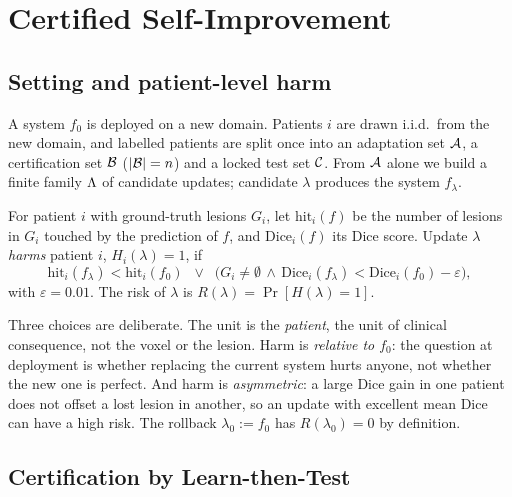 \section{Certified Self-Improvement}
\label{sec:method}

\subsection{Setting and patient-level harm}
\label{sec:harm}

A system $f_0$ is deployed on a new domain.
Patients $i$ are drawn i.i.d.\ from the new domain, and labelled patients are split once into an adaptation set $\mathcal{A}$, a certification set $\mathcal{B}$ ($|\mathcal{B}|=n$) and a locked test set $\mathcal{C}$.
From $\mathcal{A}$ alone we build a finite family $\Lambda$ of candidate updates; candidate $\lambda$ produces the system $f_\lambda$.

\begin{definition}
For patient $i$ with ground-truth lesions $G_i$, let $\mathrm{hit}_i(f)$ be the number of lesions in $G_i$ touched by the prediction of $f$, and $\mathrm{Dice}_i(f)$ its Dice score.
Update $\lambda$ \emph{harms} patient $i$, $H_i(\lambda)=1$, if
\begin{equation}
\mathrm{hit}_i(f_\lambda)<\mathrm{hit}_i(f_0)\;\;\lor\;\;\big(G_i\neq\emptyset\,\land\,\mathrm{Dice}_i(f_\lambda)<\mathrm{Dice}_i(f_0)-\varepsilon\big),
\label{eq:harm}
\end{equation}
with $\varepsilon=0.01$. The risk of $\lambda$ is $R(\lambda)=\Pr[H(\lambda)=1]$.
\end{definition}

Three choices are deliberate.
The unit is the \emph{patient}, the unit of clinical consequence, not the voxel or the lesion.
Harm is \emph{relative to $f_0$}: the question at deployment is whether replacing the current system hurts anyone, not whether the new one is perfect.
And harm is \emph{asymmetric}: a large Dice gain in one patient does not offset a lost lesion in another, so an update with excellent mean Dice can have a high risk.
The rollback $\lambda_0\!:=\!f_0$ has $R(\lambda_0)=0$ by definition.

\subsection{Certification by Learn-then-Test}
\label{sec:ltt}

